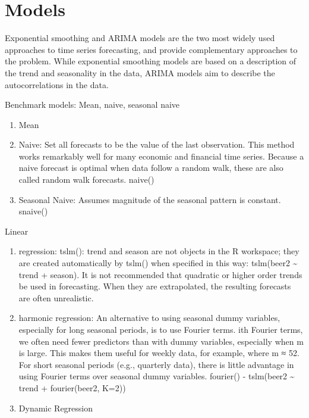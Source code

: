 \documentclass[]{book}
\begin{document}
\section{Models}\label{models}

Exponential smoothing and ARIMA models are the two most widely used
approaches to time series forecasting, and provide complementary
approaches to the problem. While exponential smoothing models are based
on a description of the trend and seasonality in the data, ARIMA models
aim to describe the autocorrelations in the data.

Benchmark models: Mean, naive, seasonal naive

\begin{enumerate}
\def\labelenumi{\arabic{enumi}.}
\setcounter{enumi}{-1}
\item
  Mean
\item
  Naive: Set all forecasts to be the value of the last observation. This
  method works remarkably well for many economic and financial time
  series. Because a naive forecast is optimal when data follow a random
  walk, these are also called random walk forecasts. naive()
\item
  Seasonal Naive: Assumes magnitude of the seasonal pattern is constant.
  snaive()
\end{enumerate}

Linear

\begin{enumerate}
\def\labelenumi{\arabic{enumi}.}
\setcounter{enumi}{9}
\item
  regression: tslm(): trend and season are not objects in the R
  workspace; they are created automatically by tslm() when specified in
  this way: tslm(beer2 \textasciitilde{} trend + season). It is not
  recommended that quadratic or higher order trends be used in
  forecasting. When they are extrapolated, the resulting forecasts are
  often unrealistic.
\item
  harmonic regression: An alternative to using seasonal dummy variables,
  especially for long seasonal periods, is to use Fourier terms. ith
  Fourier terms, we often need fewer predictors than with dummy
  variables, especially when m is large. This makes them useful for
  weekly data, for example, where m ≈ 52. For short seasonal periods
  (e.g., quarterly data), there is little advantage in using Fourier
  terms over seasonal dummy variables. fourier() - tslm(beer2
  \textasciitilde{} trend + fourier(beer2, K=2))
\item
  Dynamic Regression
\end{enumerate}
\end{document}
